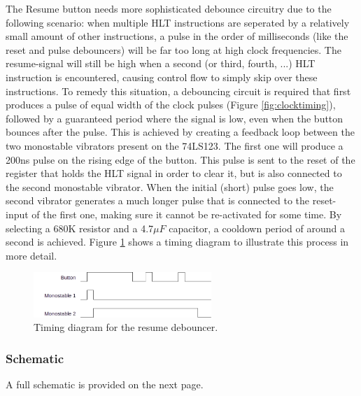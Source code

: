 The Resume button needs more sophisticated debounce circuitry due to the following scenario: when multiple HLT instructions are seperated by a relatively small amount of other instructions, a pulse in the order of milliseconds (like the reset and pulse debouncers) will be far too long at high clock frequencies. The resume-signal will still be high when a second (or third, fourth, ...) HLT instruction is encountered, causing control flow to simply skip over these instructions. To remedy this situation, a debouncing circuit is required that first produces a pulse of equal width of the clock pulses (Figure \ref{fig:clocktiming}), followed by a guaranteed period where the signal is low, even when the button bounces after the pulse. This is achieved by creating a feedback loop between the two monostable vibrators present on the 74LS123. The first one will produce a 200ns pulse on the rising edge of the button. This pulse is sent to the reset of the register that holds the HLT signal in order to clear it, but is also connected to the second monostable vibrator. When the initial (short) pulse goes low, the second vibrator generates a much longer pulse that is connected to the reset-input of the first one, making sure it cannot be re-activated for some time. By selecting a 680K resistor and a 4.7$\mu F$ capacitor, a cooldown period of around a second is achieved. Figure \ref{fig:resumedebounce} shows a timing diagram to illustrate this process in more detail. 

\begin{figure}[H]
  \centering
  \includegraphics[width=0.6\textwidth]{img/resumedebounce}
  \caption{Timing diagram for the resume debouncer.}
  \label{fig:resumedebounce}
\end{figure}


\subsubsection{Schematic}
A full schematic is provided on the next page.




